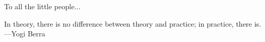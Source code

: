 \begin{acknowledge}
To all the little people...	

    \clearpage
    \vspace{3in}
    \begin{dedication}
    In theory, there is no difference between theory and practice; in practice, there is. \\ ---Yogi Berra
    \end{dedication}

\end{acknowledge}